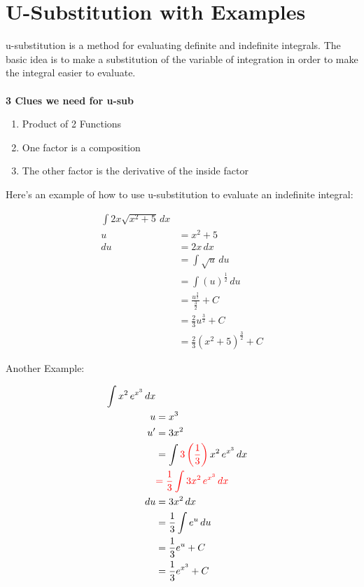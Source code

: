 \section{U-Substitution with Examples}
u-substitution is a method for evaluating definite and indefinite integrals. 
The basic idea is to make a substitution of the variable of integration in order 
to make the integral easier to evaluate.\\\\
\textbf{3 Clues we need for u-sub}
\begin{enumerate}
  \item Product of 2 Functions
  \item One factor is a composition
  \item The other factor is the derivative of the inside factor
\end{enumerate}

\noindent Here's an example of how to use u-substitution to evaluate an 
indefinite integral:

\begin{framed}
\begin{align*}
  \int 2x \sqrt{x^2+5} \, dx\\
  u &= x^2+5\\
  du &= 2x \, dx\\
  &= \int \sqrt{u} \, du\\
  &= \int (u)^{\frac{1}{2}} \, du\\
  &= \frac{u^{\frac{3}{2}}}{\frac{3}{2}} + C\\
  &= \frac{2}{3} u^{\frac{3}{2}} + C\\
  &= \frac{2}{3} (x^2+5)^{\frac{3}{2}} + C
\end{align*}
\end{framed}

\noindent Another Example:

\begin{framed}
\begin{align*}
  \int x^2 \, e^{x^3} \, dx\\
  u &= x^3\\
  u' &= 3x^2\\
  &= \int \textcolor{red}{3\left(\frac{1}{3}\right)} \, x^2 \, e^{x^3} \, dx\\
  &\textcolor{red}{= \frac{1}{3} \int 3x^2 \, e^{x^3} \, dx}\\
  du &= 3x^2 \, dx\\
  &= \frac{1}{3} \int e^u \, du\\
  &= \frac{1}{3} e^u + C\\
  &= \frac{1}{3} e^{x^3} + C
\end{align*}
\end{framed}


